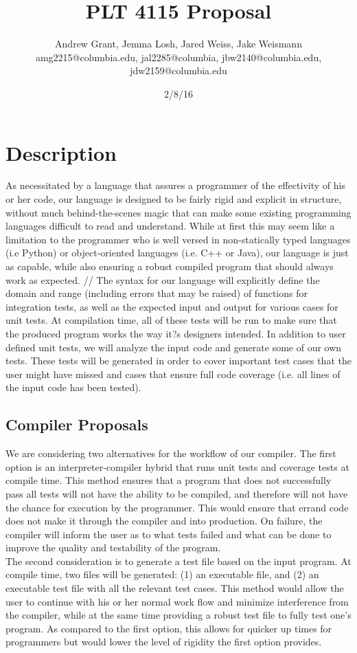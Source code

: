 \documentclass{article}
\title{PLT 4115 Proposal}
\author{Andrew Grant, Jemma Losh, Jared Weiss, Jake Weismann  \\amg2215@columbia.edu, jal2285@columbia, jbw2140@columbia.edu, jdw2159@columbia.edu}
\date{2/8/16}
\begin{document}
\maketitle

\section{Description}
As necessitated by a language that assures a programmer of the effectivity of his or her code, our language is designed to be fairly rigid and explicit in structure, without much behind-the-scenes magic that can make some existing programming languages difficult to read and understand. While at first this may seem like a limitation to the programmer who is well versed in non-statically typed languages (i.e Python) or object-oriented languages (i.e. C++ or Java), our language is just as capable, while also ensuring a robust compiled program that should always work as expected. //
The syntax for our language will explicitly define the domain and range (including errors that may be raised) of functions for integration tests, as well as the expected input and output for various cases for unit tests. At compilation time, all of these tests will be run to make sure that the produced program works the way it?s designers intended. In addition to user defined unit tests, we will analyze the input code and generate some of our own tests. These tests will be generated in order to cover important test cases that the user might have missed and cases that ensure full code coverage (i.e. all lines of the input code has been tested).

\subsection{Compiler Proposals}
We are considering two alternatives for the workflow of our compiler. The first option is an interpreter-compiler hybrid that runs unit tests and coverage tests at compile time. This method ensures that a program that does not successfully pass all tests will not have the ability to be compiled, and therefore will not have the chance for execution by the programmer. This would ensure that errand code does not make it through the compiler and into production. On failure, the compiler will inform the user as to what tests failed and what can be done to improve the quality and testability of the program. \\
The second consideration is to generate a test file based on the input program. At compile time, two files will be generated: (1) an executable file, and (2) an executable test file with all the relevant test cases. This method would allow the user to continue with his or her normal work flow and minimize interference from the compiler, while at the same time providing a robust test file to fully test one's program. As compared to the first option, this allows for quicker up times for programmers but would lower the level of rigidity the first option provides.
\end{document}
